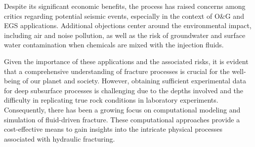 Despite its significant economic benefits, the process has raised concerns among critics regarding potential seismic events, especially in the context of O\&G and EGS applications. Additional objections center around the environmental impact, including air and noise pollution, as well as the risk of groundwater and surface water contamination when chemicals are mixed with the injection fluids.

Given the importance of these applications and the associated risks, it is evident that a comprehensive understanding of fracture processes is crucial for the well-being of our planet and society. However, obtaining sufficient experimental data for deep subsurface processes is challenging due to the depths involved and the difficulty in replicating true rock conditions in laboratory experiments. Consequently, there has been a growing focus on computational modeling and simulation of fluid-driven fracture. These computational approaches provide a cost-effective means to gain insights into the intricate physical processes associated with hydraulic fracturing.

